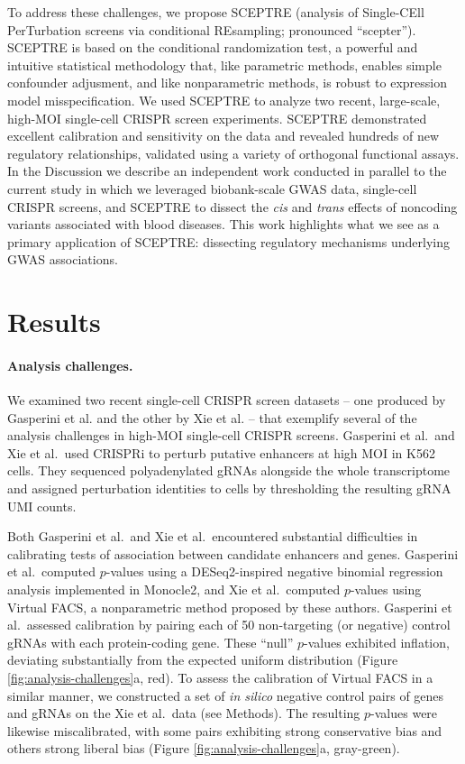 \documentclass{article}
\begin{document}
To address these challenges, we propose SCEPTRE (analysis of Single-CEll PerTurbation screens via conditional REsampling; pronounced ``scepter''). SCEPTRE is based on the conditional randomization test\cite{CetL16}, a powerful and intuitive statistical methodology that, like parametric methods, enables simple confounder adjusment, and like nonparametric methods, is robust to expression model misspecification. We used SCEPTRE to analyze two recent, large-scale, high-MOI single-cell CRISPR screen experiments. SCEPTRE demonstrated excellent calibration and sensitivity on the data and revealed hundreds of new regulatory relationships, validated using a variety of orthogonal functional assays. In the Discussion we describe an independent work conducted in parallel to the current study in which we leveraged biobank-scale GWAS data, single-cell CRISPR screens, and SCEPTRE to dissect the \textit{cis} and \textit{trans} effects of noncoding variants associated with blood diseases\cite{Morris2021}. This work highlights what we see as a primary application of SCEPTRE: dissecting regulatory mechanisms underlying GWAS associations.

\section*{Results}

\paragraph{Analysis challenges.} 

We examined two recent single-cell CRISPR screen datasets -- one produced by Gasperini et al.\cite{Gasperini2019} and the other by Xie et al.\cite{Xie2019} -- that exemplify several of the analysis challenges in high-MOI single-cell CRISPR screens. Gasperini et al.\ and Xie et al.\ used CRISPRi to perturb putative enhancers at high MOI in K562 cells. They sequenced polyadenylated gRNAs alongside the whole transcriptome and assigned perturbation identities to cells by thresholding the resulting gRNA UMI counts.

Both Gasperini et al.\ and Xie et al.\ encountered substantial difficulties in calibrating tests of association between candidate enhancers and genes. Gasperini et al.\ computed $p$-values using a DESeq2\cite{Love2014}-inspired negative binomial regression analysis implemented in Monocle2\cite{Qiu2017}, and Xie et al.\ computed $p$-values using Virtual FACS, a nonparametric method proposed by these authors. Gasperini et al.\ assessed calibration by pairing each of 50 non-targeting (or negative) control gRNAs with each protein-coding gene. These ``null'' $p$-values exhibited inflation, deviating substantially from the expected uniform distribution (Figure \ref{fig:analysis-challenges}a, red). To assess the calibration of Virtual FACS in a similar manner, we constructed a set of \textit{in silico} negative control pairs of genes and gRNAs on the Xie et al.\ data (see Methods). The resulting $p$-values were likewise miscalibrated, with some pairs exhibiting strong conservative bias and others strong liberal bias (Figure \ref{fig:analysis-challenges}a, gray-green).
\end{document}

